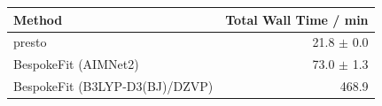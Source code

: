 \begin{tabular}{lr}
\toprule
Method & Total Wall Time / min \\
\midrule
presto & 21.8 $\pm$ 0.0 \\
BespokeFit (AIMNet2) & 73.0 $\pm$ 1.3 \\
BespokeFit (B3LYP-D3(BJ)/DZVP) & 468.9 \\
\bottomrule
\end{tabular}
